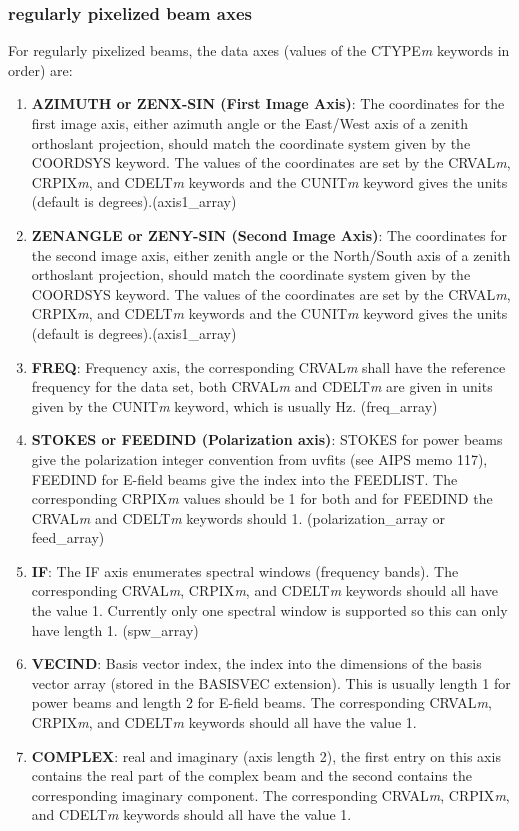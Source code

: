 \documentclass[11pt, oneside]{article}   	%
\begin{document}
\subsubsection{regularly pixelized beam axes}
For regularly pixelized beams, the data axes (values of the CTYPE\textit{m} keywords in order) are: 

\begin{enumerate}
\item{\textbf{AZIMUTH or ZENX-SIN (First Image Axis)}: The coordinates for the first image axis, either azimuth angle or the East/West axis of a zenith orthoslant projection, should match the coordinate system given by the COORDSYS keyword. The values of the coordinates are set by the CRVAL\textit{m}, CRPIX\textit{m}, and CDELT\textit{m} keywords and the CUNIT\textit{m} keyword gives the units (default is degrees).(axis1\_array)}
\item{\textbf{ZENANGLE or ZENY-SIN (Second Image Axis)}: The coordinates for the second image axis, either zenith angle or the North/South axis of a zenith orthoslant projection, should match the coordinate system given by the COORDSYS keyword. The values of the coordinates are set by the CRVAL\textit{m}, CRPIX\textit{m}, and CDELT\textit{m} keywords and the CUNIT\textit{m} keyword gives the units (default is degrees).(axis1\_array)}
\item{\textbf{FREQ}: Frequency axis, the corresponding CRVAL\textit{m} shall have the reference frequency for the data set, both CRVAL\textit{m} and CDELT\textit{m} are given in units given by the CUNIT\textit{m} keyword, which is usually Hz. (freq\_array)}
\item{\textbf{STOKES or FEEDIND (Polarization axis)}: STOKES for power beams give the polarization integer convention from uvfits (see AIPS memo 117), FEEDIND for E-field beams give the index into the FEEDLIST. The corresponding CRPIX\textit{m} values should be 1 for both and for FEEDIND the CRVAL\textit{m} and CDELT\textit{m} keywords should 1. (polarization\_array or feed\_array)}
\item{\textbf{IF}: The IF axis enumerates spectral windows (frequency bands). The corresponding CRVAL\textit{m}, CRPIX\textit{m}, and CDELT\textit{m} keywords should all have the value 1. Currently only one spectral window is supported so this can only have length 1. (spw\_array)}
\item{\textbf{VECIND}: Basis vector index, the index into the dimensions of the basis vector array (stored in the BASISVEC extension). This is usually length 1 for power beams and length 2 for E-field beams. The corresponding CRVAL\textit{m}, CRPIX\textit{m}, and CDELT\textit{m} keywords should all have the value 1.}
\item{\textbf{COMPLEX}: real and imaginary (axis length 2), the first entry on this axis contains the real part of the complex beam and the second contains the corresponding imaginary component. The corresponding CRVAL\textit{m}, CRPIX\textit{m}, and CDELT\textit{m} keywords should all have the value 1.}
\end{enumerate}
\end{document}
